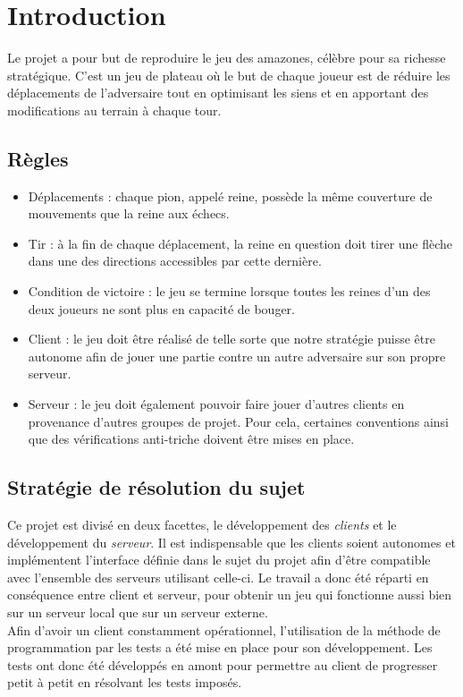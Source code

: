 \chapter{Introduction}
\label{chap:intro}

Le projet a pour but de reproduire le jeu des amazones, célèbre pour sa richesse stratégique. C’est un jeu de plateau où le but de chaque joueur est de réduire les déplacements de l'adversaire tout en optimisant les siens et en apportant des modifications au terrain à chaque tour. 

\section{Règles}
\label{sec:regles}

\begin{itemize}
    \item[\textdagger] Déplacements : chaque pion, appelé reine, possède la même couverture de mouvements que la reine aux échecs.
    \medbreak
    \item [\textdagger] Tir : à la fin de chaque déplacement, la reine en question doit tirer une flèche dans une des directions accessibles par cette dernière.
    \medbreak
    \item [\textdagger] Condition de victoire : le jeu se termine lorsque toutes les reines d’un des deux joueurs ne sont plus en capacité de bouger.
    \medbreak
    \item [\textdagger] Client : le jeu doit être réalisé de telle sorte que notre stratégie puisse être autonome afin de jouer une partie contre un autre adversaire sur son propre serveur.
    \medbreak
    \item [\textdagger] Serveur : le jeu doit également pouvoir faire jouer d'autres clients en provenance d'autres groupes de projet. Pour cela, certaines conventions ainsi que des vérifications anti-triche doivent être mises en place.
\end{itemize}

\section{Stratégie de résolution du sujet}
\label{sec:strat_resol}

Ce projet est divisé en deux facettes, le développement des \textit{clients} et le développement du \textit{serveur}. Il est indispensable que les clients soient autonomes et implémentent l'interface définie dans le sujet du projet afin d'être compatible avec l'ensemble des serveurs utilisant celle-ci. Le travail a donc été réparti en conséquence entre client et serveur, pour obtenir un jeu qui fonctionne aussi bien sur un serveur local que sur un serveur externe.\\
Afin d'avoir un client constamment opérationnel, l'utilisation de la méthode de programmation par les tests a été mise en place pour son développement. Les tests ont donc été développés en amont pour permettre au client de progresser petit à petit en résolvant les tests imposés.

